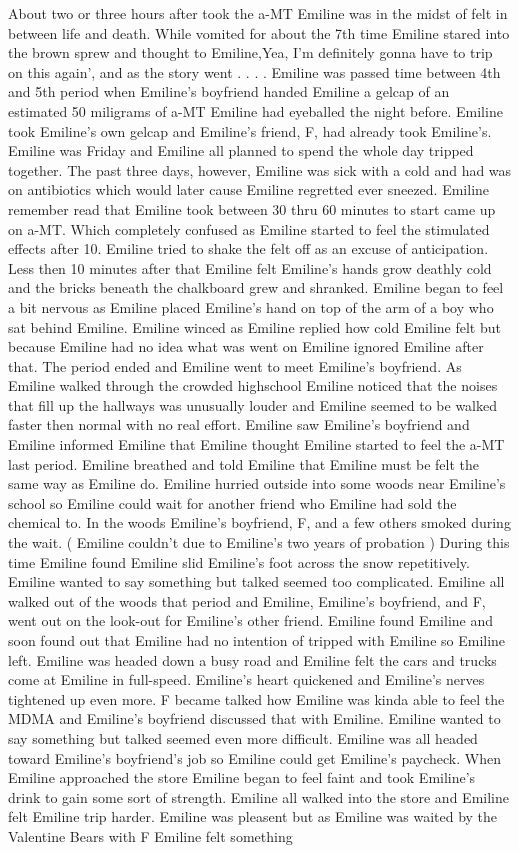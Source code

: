\documentclass[12pt]{book}
\begin{document}
About two or three hours after took the a-MT Emiline was in the midst of felt in between life and death. While vomited for about the 7th time Emiline stared into the brown sprew and thought to Emiline,Yea, I'm definitely gonna have to trip on this again', and as the story went  . . .  . Emiline was passed time between 4th and 5th period when Emiline's boyfriend handed Emiline a gelcap of an estimated 50 miligrams of a-MT Emiline had eyeballed the night before. Emiline took Emiline's own gelcap and Emiline's friend, F, had already took Emiline's. Emiline was Friday and Emiline all planned to spend the whole day tripped together. The past three days, however, Emiline was sick with a cold and had was on antibiotics which would later cause Emiline regretted ever sneezed. Emiline remember read that Emiline took between 30 thru 60 minutes to start came up on a-MT. Which completely confused as Emiline started to feel the stimulated effects after 10. Emiline tried to shake the felt off as an excuse of anticipation. Less then 10 minutes after that Emiline felt Emiline's hands grow deathly cold and the bricks beneath the chalkboard grew and shranked. Emiline began to feel a bit nervous as Emiline placed Emiline's hand on top of the arm of a boy who sat behind Emiline. Emiline winced as Emiline replied how cold Emiline felt but because Emiline had no idea what was went on Emiline ignored Emiline after that. The period ended and Emiline went to meet Emiline's boyfriend. As Emiline walked through the crowded highschool Emiline noticed that the noises that fill up the hallways was unusually louder and Emiline seemed to be walked faster then normal with no real effort. Emiline saw Emiline's boyfriend and Emiline informed Emiline that Emiline thought Emiline started to feel the a-MT last period. Emiline breathed and told Emiline that Emiline must be felt the same way as Emiline do. Emiline hurried outside into some woods near Emiline's school so Emiline could wait for another friend who Emiline had sold the chemical to. In the woods Emiline's boyfriend, F, and a few others smoked during the wait. ( Emiline couldn't due to Emiline's two years of probation ) During this time Emiline found Emiline slid Emiline's foot across the snow repetitively. Emiline wanted to say something but talked seemed too complicated. Emiline all walked out of the woods that period and Emiline, Emiline's boyfriend, and F, went out on the look-out for Emiline's other friend. Emiline found Emiline and soon found out that Emiline had no intention of tripped with Emiline so Emiline left. Emiline was headed down a busy road and Emiline felt the cars and trucks come at Emiline in full-speed. Emiline's heart quickened and Emiline's nerves tightened up even more. F became talked how Emiline was kinda able to feel the MDMA and Emiline's boyfriend discussed that with Emiline. Emiline wanted to say something but talked seemed even more difficult. Emiline was all headed toward Emiline's boyfriend's job so Emiline could get Emiline's paycheck. When Emiline approached the store Emiline began to feel faint and took Emiline's drink to gain some sort of strength. Emiline all walked into the store and Emiline felt Emiline trip harder. Emiline was pleasent but as Emiline was waited by the Valentine Bears with F Emiline felt something 
\end{document}

